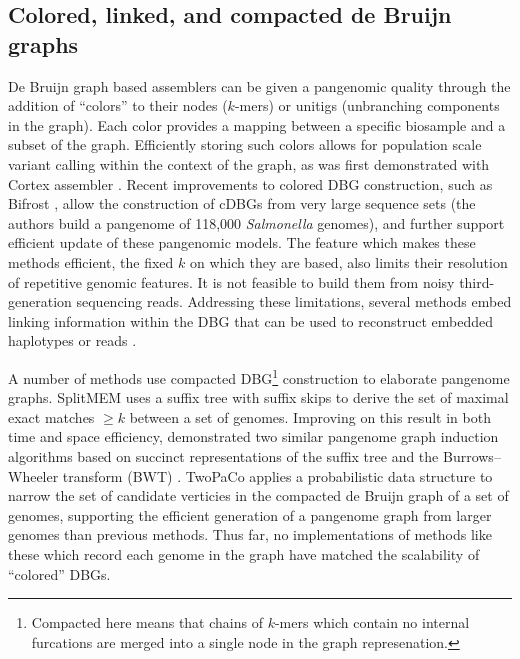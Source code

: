 

\subsection{Colored, linked, and compacted de Bruijn graphs}

De Bruijn graph based assemblers can be given a pangenomic quality through the addition of ``colors'' to their nodes ($k$-mers) or unitigs (unbranching components in the graph).
Each color provides a mapping between a specific biosample and a subset of the graph.
Efficiently storing such colors allows for population scale variant calling within the context of the graph, as was first demonstrated with Cortex assembler \cite{Iqbal_2012}.
Recent improvements to colored DBG construction, such as Bifrost \cite{holley2019bifrost}, allow the construction of cDBGs from very large sequence sets (the authors build a pangenome of 118,000 \emph{Salmonella} genomes), and further support efficient update of these pangenomic models.
The feature which makes these methods efficient, the fixed $k$ on which they are based, also limits their resolution of repetitive genomic features.
It is not feasible to build them from noisy third-generation sequencing reads.
Addressing these limitations, several methods embed linking information within the DBG that can be used to reconstruct embedded haplotypes or reads \cite{Bolger_2017,Turner_2018}.

A number of methods use compacted DBG\footnote{Compacted here means that chains of $k$-mers which contain no internal furcations are merged into a single node in the graph represenation.} construction to elaborate pangenome graphs.
SplitMEM \cite{Marcus_2014} uses a suffix tree with suffix skips to derive the set of maximal exact matches $\geq k$ between a set of genomes.
Improving on this result in both time and space efficiency, \cite{Baier_2015} demonstrated two similar pangenome graph induction algorithms based on succinct representations of the suffix tree and the Burrows--Wheeler transform (BWT) \cite{Burrows_1994}.
TwoPaCo \cite{Minkin_2016} applies a probabilistic data structure to narrow the set of candidate verticies in the compacted de Bruijn graph of a set of genomes, supporting the efficient generation of a pangenome graph from larger genomes than previous methods.
Thus far, no implementations of methods like these which record each genome in the graph have matched the scalability of ``colored'' DBGs.

